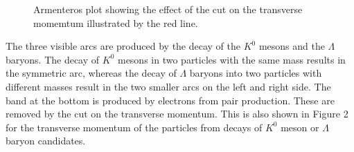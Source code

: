\begin{figure}[!h]
  \centering
	\caption{Armenteros plot showing the effect of the cut on the transverse momemtum illustrated by the red line.}
	\label{pic:Armenteros}
\end{figure}

The three visible arcs are produced by the decay of the $K^0$ mesons and the $\Lambda$ baryons. The decay of $K^0$ mesons in two particles with the same mass results in the symmetric arc, whereas the decay of $\Lambda$ baryons into two particles with different masses result in the two smaller arcs on the left and right side. The band at the bottom is produced by electrons from pair production. These are removed by the cut on the transverse momentum. This is also shown in Figure 2 for the transverse momentum of the particles from decays of $K^0$ meson or $\Lambda$ baryon candidates.

